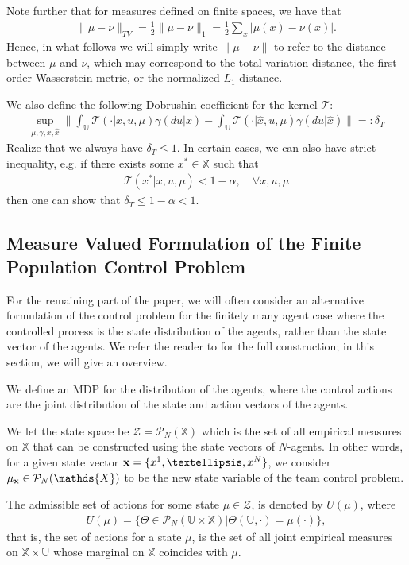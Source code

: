 \documentclass[twoside,11pt]{article}
\def\P{{\mathcal P}}
\begin{document}
Note further that for measures defined on finite spaces, we have that
\begin{align}\label{norm}
\|\mu-\nu\|_{TV}=\frac{1}{2}\|\mu-\nu\|_1=\frac{1}{2}\sum_x\left|\mu(x)-\nu(x)\right|.
\end{align}
Hence, in what follows we will simply write $\|\mu-\nu\|$ to refer to the distance between $\mu$ and $\nu$, which may correspond to the total variation distance,  the first order Wasserstein metric, or the normalized $L_1$ distance.


We also define the following Dobrushin coefficient for the kernel $\mathcal{T}$:
\begin{align}\label{dob}
\sup_{\mu,\gamma,x,\hat{x}}\|\int_{\mathds{U}}\mathcal{T}(\cdot|x,u,\mu)\gamma(du|x)-\int_{\mathds{U}}\mathcal{T}(\cdot|\hat{x},u,\mu)\gamma(du|\hat{x})\|=:\delta_T
\end{align}
Realize that we always have $\delta_T\leq 1$. In certain cases, we can also have strict inequality, e.g. if there exists some $x^*\in\mathds{X}$ such that
\begin{align*}
\mathcal{T}(x^*|x,u,\mu)<1-\alpha,\quad \forall x,u,\mu
\end{align*}
 then one can show that $\delta_T\leq1-\alpha<1.$

\subsection{Measure Valued Formulation of the Finite Population Control Problem}\label{fin_meas_sec}
For the remaining part of the paper, we will often consider an alternative formulation of the control problem for the finitely many agent case where the controlled process is the state distribution of the agents, rather than the state vector of the agents. We refer the reader to \cite{bayraktar2023finite} for the full construction; in this section, we will give an overview.


We define an MDP for the distribution of the agents, where the control actions are the joint distribution of the state and action vectors of the agents. 

We let the state space be  $\mathcal{Z}=\P_N(\mathds{X})$ which is the set of all empirical measures on $\mathds{X}$ that can be constructed using the state vectors of  $N$-agents. In other words, for a given state vector ${\bf x}=\{x^1,\dots,x^N\}$, we consider $\mu_{\bf x}\in \P_N(\mathds{X})$ to be the new state variable of the team control problem.

The admissible set of actions for some state $\mu\in\mathcal{Z}$, is denoted by $U(\mu)$, where
\begin{align}\label{add_act}
U(\mu)=\{\Theta\in \P_N(\mathds{U}\times\mathds{X})|\Theta(\mathds{U},\cdot)=\mu(\cdot)\},
\end{align}
that is, the set of actions for a state $\mu$, is the set of all joint empirical measures on $\mathds{X}\times\mathds{U}$ whose marginal on $\mathds{X}$ coincides with $\mu$.
\end{document}

